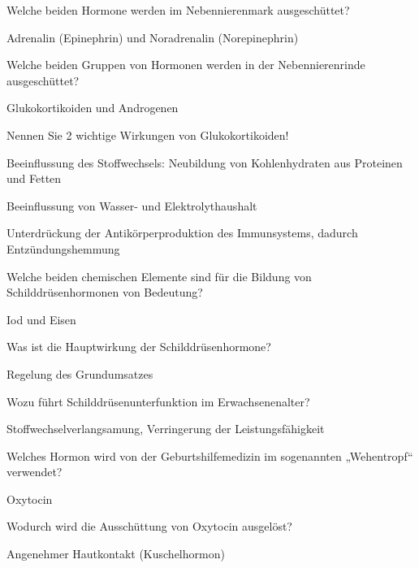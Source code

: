 \documentclass[10pt, a4paper]{exam}
\begin{document}
\begin{questions}
  \question Welche beiden Hormone werden im Nebennierenmark ausgeschüttet?
  \begin{solution}
    Adrenalin (Epinephrin) und Noradrenalin (Norepinephrin)
  \end{solution}

  \question Welche beiden Gruppen von Hormonen werden in der Nebennierenrinde ausgeschüttet?
  \begin{solution}
    Glukokortikoiden und Androgenen
  \end{solution}

  \question Nennen Sie 2 wichtige Wirkungen von Glukokortikoiden!
  \begin{solution}
    \begin{itemize*}
      \item Beeinflussung des Stoffwechsels: Neubildung von Kohlenhydraten aus Proteinen und Fetten
      \item Beeinflussung von Wasser- und Elektrolythaushalt
      \item Unterdrückung der Antikörperproduktion des Immunsystems, dadurch Entzündungshemmung
    \end{itemize*}
  \end{solution}

  \question Welche beiden chemischen Elemente sind für die Bildung von Schilddrüsenhormonen von Bedeutung?
  \begin{solution}
    Iod und Eisen
  \end{solution}

  \question Was ist die Hauptwirkung der Schilddrüsenhormone?
  \begin{solution}
    Regelung des Grundumsatzes
  \end{solution}

  \question Wozu führt Schilddrüsenunterfunktion im Erwachsenenalter?
  \begin{solution}
    Stoffwechselverlangsamung, Verringerung der Leistungsfähigkeit
  \end{solution}

  \question Welches Hormon wird von der Geburtshilfemedizin im sogenannten „Wehentropf“ verwendet?
  \begin{solution}
    Oxytocin
  \end{solution}

  \question Wodurch wird die Ausschüttung von Oxytocin ausgelöst?
  \begin{solution}
    Angenehmer Hautkontakt (Kuschelhormon)
  \end{solution}


\end{questions}
\end{document}
